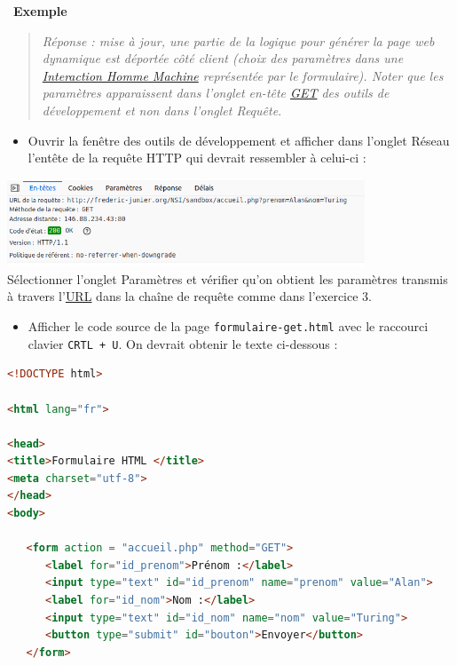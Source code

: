 \documentclass[
  11pt,
]{article}
\newcommand{\passthrough}[1]{#1}
\providecommand{\tightlist}{%
  \setlength{\itemsep}{0pt}\setlength{\parskip}{0pt}}
\newcounter{exple}
\newenvironment{exemple}[1]
{\par \medskip   \addtocounter{exple}{1} \noindent  
\begin{bclogo}[arrondi =0.1,   noborder = true, logo=\bclampe, marge=4]{~\textbf{Exemple} \textbf{\theexple} {\itshape #1} }  \par}
{
\end{bclogo}
 \par \bigskip }
\newcounter{logi}
\begin{document}
\begin{exemple}{}
\begin{enumerate}
  \begin{quote}
  \emph{Réponse : mise à jour, une partie de la logique pour générer la
  page web dynamique est déportée côté client (choix des paramètres dans
  une
  \href{https://interstices.info/domaine/interaction-hommemachine/}{Interaction
  Homme Machine} représentée par le formulaire). Noter que les
  paramètres apparaissent dans l'onglet en-tête \url{GET} des outils de
  développement et non dans l'onglet Requête}.
  \end{quote}

  \begin{itemize}
  \tightlist
  \item
    Ouvrir la fenêtre des outils de développement et afficher dans
    l'onglet Réseau l'entête de la requête HTTP qui devrait ressembler à
    celui-ci :
  \end{itemize}

  \includegraphics[width=0.8\textwidth,height=\textheight]{images/entete-get.png}\\

  Sélectionner l'onglet Paramètres et vérifier qu'on obtient les
  paramètres transmis à travers
  l'\href{https://developer.mozilla.org/fr/docs/Glossaire/URL}{URL} dans
  la chaîne de requête comme dans l'exercice 3.

  \begin{itemize}
  \tightlist
  \item
    Afficher le code source de la page
    \passthrough{\lstinline!formulaire-get.html!} avec le raccourci
    clavier \passthrough{\lstinline!CRTL + U!}. On devrait obtenir le
    texte ci-dessous :
  \end{itemize}

\begin{lstlisting}[language=HTML]
<!DOCTYPE html>

<html lang="fr">

<head>
<title>Formulaire HTML </title>
<meta charset="utf-8">    
</head> 
<body>

   <form action = "accueil.php" method="GET">        
      <label for="id_prenom">Prénom :</label>
      <input type="text" id="id_prenom" name="prenom" value="Alan">
      <label for="id_nom">Nom :</label>
      <input type="text" id="id_nom" name="nom" value="Turing">
      <button type="submit" id="bouton">Envoyer</button>
   </form>


\end{lstlisting}
\end{enumerate}
\end{exemple}
\end{document}
